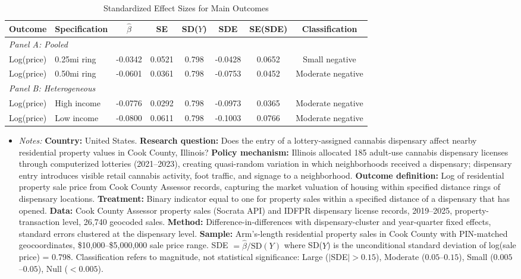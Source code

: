 \begin{table}[H]
\centering
\caption{Standardized Effect Sizes for Main Outcomes}
\label{tab:sde}
\begin{adjustbox}{max width=\textwidth}
\begin{tabular}{llcccccc}
\toprule
Outcome & Specification & $\hat{\beta}$ & SE & SD($Y$) & SDE & SE(SDE) & Classification \\
\midrule
\multicolumn{8}{l}{\textit{Panel A: Pooled}} \\
Log(price) & 0.25mi ring & -0.0342 & 0.0521 & 0.798 & -0.0428 & 0.0652 & Small negative \\
Log(price) & 0.50mi ring & -0.0601 & 0.0361 & 0.798 & -0.0753 & 0.0452 & Moderate negative \\
\midrule
\multicolumn{8}{l}{\textit{Panel B: Heterogeneous}} \\
Log(price) & High income & -0.0776 & 0.0292 & 0.798 & -0.0973 & 0.0365 & Moderate negative \\
Log(price) & Low income & -0.0800 & 0.0611 & 0.798 & -0.1003 & 0.0766 & Moderate negative \\
\bottomrule
\end{tabular}
\end{adjustbox}
\par\vspace{0.3em}
{\footnotesize
\begin{itemize}[leftmargin=*]
\item \textit{Notes:} \textbf{Country:} United States. \textbf{Research question:} Does the entry of a lottery-assigned cannabis dispensary affect nearby residential property values in Cook County, Illinois? \textbf{Policy mechanism:} Illinois allocated 185 adult-use cannabis dispensary licenses through computerized lotteries (2021--2023), creating quasi-random variation in which neighborhoods received a dispensary; dispensary entry introduces visible retail cannabis activity, foot traffic, and signage to a neighborhood. \textbf{Outcome definition:} Log of residential property sale price from Cook County Assessor records, capturing the market valuation of housing within specified distance rings of dispensary locations. \textbf{Treatment:} Binary indicator equal to one for property sales within a specified distance of a dispensary that has opened. \textbf{Data:} Cook County Assessor property sales (Socrata API) and IDFPR dispensary license records, 2019--2025, property-transaction level, 26,740 geocoded sales. \textbf{Method:} Difference-in-differences with dispensary-cluster and year-quarter fixed effects, standard errors clustered at the dispensary level. \textbf{Sample:} Arm's-length residential property sales in Cook County with PIN-matched geocoordinates, \$10,000--\$5,000,000 sale price range. SDE $= \hat{\beta} / \text{SD}(Y)$ where SD($Y$) is the unconditional standard deviation of log(sale price) = 0.798. Classification refers to magnitude, not statistical significance: Large ($|$SDE$| > 0.15$), Moderate ($0.05$--$0.15$), Small ($0.005$--$0.05$), Null ($< 0.005$).
\end{itemize}}
\end{table}

